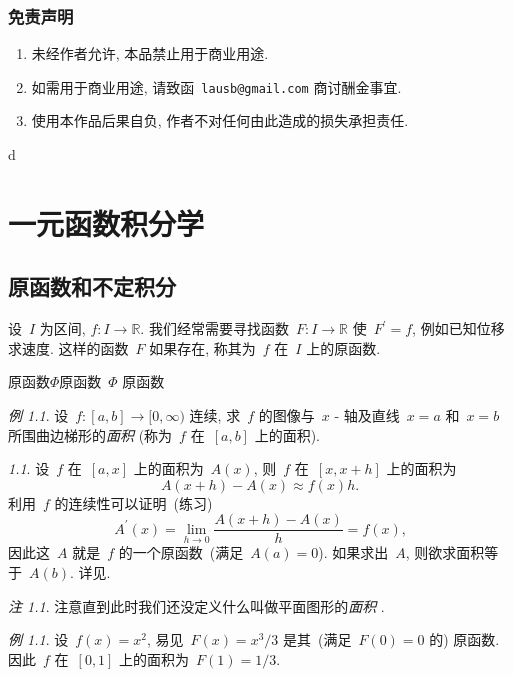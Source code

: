 \documentclass[12pt]{ctexbook}
\newcommand{\chap}[1]{\chapter{#1}\fancyhead[CE]{第\CJKnumber{\thechapter}章\quad
#1}\fancyhead[CO]{\S\rightmark}}
\theoremstyle{definition}
\theoremstyle{remark}
\newtheorem{rem}[thm]{注}
\newtheorem*{pf}{\CJKfamily{kai}{证}}
\newtheorem{exmp}[thm]{例}
\begin{document}
\subsection*{免责声明}

\begin{enumerate}
\item 未经作者允许, 本品禁止用于商业用途.
\item 如需用于商业用途, 请致函~\verb|lausb@gmail.com| 商讨酬金事宜.
\item 使用本作品后果自负, 作者不对任何由此造成的损失承担责任.
\end{enumerate}

\newpage

d

\newpage

\fancyhead[CE]{\leftmark}\fancyhead[CO]{\S\rightmark}
\tableofcontents


\chap{一元函数积分学}
\setcounter{page}{1}
\section{原函数和不定积分}

设~$I$ 为区间, $f:I\rightarrow\mathbb{R}$.
我们经常需要寻找函数~$F:I\rightarrow
\mathbb{R}$ 使~$F^{\prime}=f$,
例如已知位移求速度.
这样的函数~$F$ 如果存在,
称其为~$f$ 在~$I$ 上的原函数.

原函数$\Phi$原函数~$\Phi$ 原函数

\begin{exmp}
\label{exp1}设~$f:\left[  a,b\right]  \rightarrow\lbrack0,\infty)$
连续, 求~$f$ 的图像与~$x$ -
轴及直线~$x=a$ 和~$x=b$
所围曲边梯形的\emph{面积}
(称为~$f$ 在~$[a,b]$ 上的面积).
\end{exmp}

\begin{pf}
设~$f$ 在~$[a,x]$ 上的面积为~$A(x)$,
则~$f$ 在~$\left[  x,x+h\right]  $
上的面积为
\[
A(x+h)-A(x)\approx f(x)h\text{.}%
\]
利用~$f$
的连续性可以证明~(练习)
\[
A^{\prime}(x)=\lim_{h\rightarrow0}\frac{A(x+h)-A(x)}{h}=f(x)\text{,}%
\]
因此这~$A$ 就是~$f$
的一个原函数~(满足~$A(a)=0$).
如果求出~$A$,
则欲求面积等于~$A(b)$. 详见\cite{MR3882064,MR2767062}.
\end{pf}

\begin{rem}
注意直到此时我们还没定义什么叫做平面图形的\emph{面积}%
.
\end{rem}

\begin{exmp}
设~$f(x)=x^{2}$, 易见~$F(x)=x^{3}/3$
是其~(满足~$F(0)=0$ 的) 原函数.
因此~$f$ 在~$\left[  0,1\right]  $
上的面积为~$F(1)=1/3$.
\end{exmp}
\end{document}
